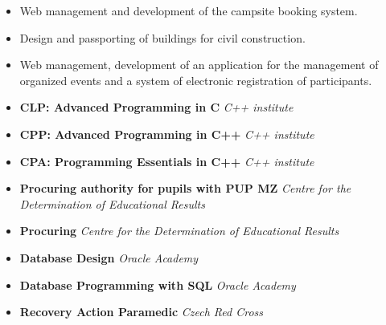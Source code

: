 \documentclass[10pt,a4paper,ragged2e]{altacv}
\begin{document}
\divider

\begin{itemize}
\item Web management and development of the campsite booking system. 
\end{itemize}
 
\divider

\begin{itemize}
\item Design and passporting of buildings for civil construction.
\end{itemize}

\divider

\begin{itemize}
\item Web management, development of an application for the management of organized events and a system of electronic registration of participants.
\end{itemize}


\smallskip
\begin{itemize}
\item \textbf{CLP: Advanced Programming in C} \textit{C++ institute}
\item \textbf{CPP: Advanced Programming in C++} \textit{C++ institute}
\item \textbf{CPA: Programming Essentials in C++} \textit{C++ institute}
\item \textbf{Procuring authority for pupils with PUP MZ} \textit{Centre for the Determination of Educational Results}
\item \textbf{Procuring} \textit{Centre for the Determination of Educational Results}
\item \textbf{Database Design} \textit{Oracle Academy}
\item \textbf{Database Programming with SQL} \textit{Oracle Academy}
\item \textbf{Recovery Action Paramedic} \textit{Czech Red Cross}
\end{itemize}


\clearpage

\end{document}
